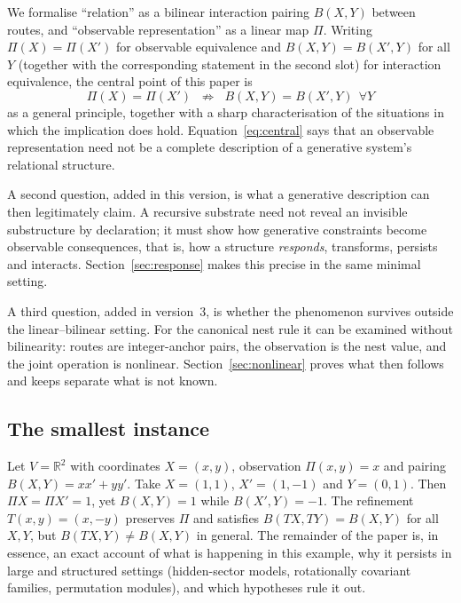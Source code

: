 \documentclass[11pt,a4paper]{article}
\newcommand{\RR}{\mathbb{R}}
\theoremstyle{plain}
\theoremstyle{definition}
\begin{document}
We formalise ``relation'' as a bilinear interaction pairing $B(X,Y)$ between routes, and ``observable representation'' as a linear map $\Pi$.
Writing $\Pi(X)=\Pi(X')$ for observable equivalence and $B(X,Y)=B(X',Y)$ for all $Y$ (together with the corresponding statement in the second slot) for interaction equivalence, the central point of this paper is
\begin{equation}\label{eq:central}
\boxed{\;\Pi(X)=\Pi(X')\;\;\not\Rightarrow\;\; B(X,Y)=B(X',Y)\ \ \forall Y\;}
\end{equation}
as a general principle, together with a sharp characterisation of the situations in which the implication does hold.
Equation~\eqref{eq:central} says that an observable representation need not be a complete description of a generative system's relational structure.

A second question, added in this version, is what a generative description can then legitimately claim. A recursive substrate need not reveal an invisible substructure by declaration; it must show how generative constraints become observable consequences, that is, how a structure \emph{responds}, transforms, persists and interacts. Section~\ref{sec:response} makes this precise in the same minimal setting.

A third question, added in version~3, is whether the phenomenon survives outside the linear--bilinear setting. For the canonical nest rule it can be examined without bilinearity: routes are integer-anchor pairs, the observation is the nest value, and the joint operation is nonlinear. Section~\ref{sec:nonlinear} proves what then follows and keeps separate what is not known.

\subsection{The smallest instance}\label{sec:smallest}
Let $V=\RR^2$ with coordinates $X=(x,y)$, observation $\Pi(x,y)=x$ and pairing $B(X,Y)=xx'+yy'$.
Take $X=(1,1)$, $X'=(1,-1)$ and $Y=(0,1)$.
Then $\Pi X=\Pi X'=1$, yet $B(X,Y)=1$ while $B(X',Y)=-1$.
The refinement $T(x,y)=(x,-y)$ preserves $\Pi$ and satisfies $B(TX,TY)=B(X,Y)$ for all $X,Y$, but $B(TX,Y)\neq B(X,Y)$ in general.
The remainder of the paper is, in essence, an exact account of what is happening in this example, why it persists in large and structured settings (hidden-sector models, rotationally covariant families, permutation modules), and which hypotheses rule it out.
\end{document}
